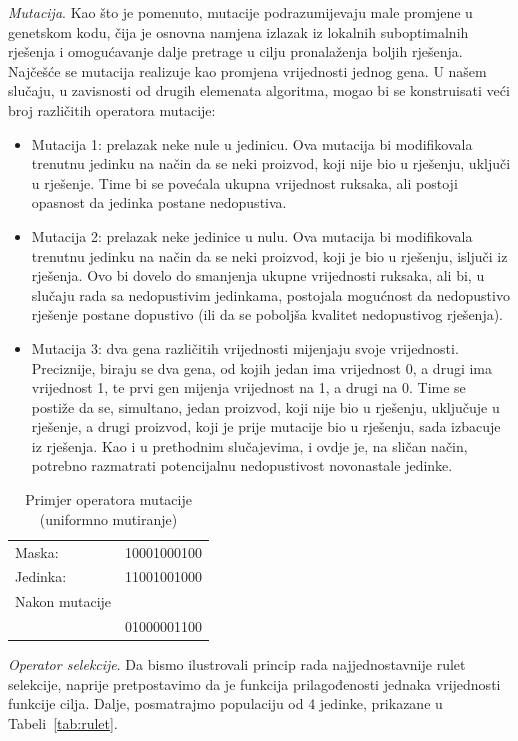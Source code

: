 \documentclass[a4paper, utf8, 11pt, colorlinks]{book}
\begin{document}
\emph{Mutacija}. Kao što je pomenuto, mutacije podrazumijevaju male promjene u genetskom kodu, čija je osnovna namjena izlazak iz lokalnih suboptimalnih rješenja i omogućavanje dalje pretrage u cilju pronalaženja boljih rješenja. Najčešće se mutacija realizuje kao promjena vrijednosti jednog gena. U našem slučaju, u zavisnosti od drugih elemenata algoritma, mogao bi se konstruisati veći broj različitih operatora mutacije: 
\begin{itemize}
	\item Mutacija 1: prelazak neke nule u jedinicu. Ova mutacija bi modifikovala trenutnu jedinku na način da se neki proizvod, koji nije bio u rješenju, uključi u rješenje. Time bi se povećala ukupna vrijednost ruksaka, ali postoji opasnost da jedinka postane nedopustiva.
	\item  Mutacija 2: prelazak neke jedinice u nulu. Ova mutacija bi modifikovala trenutnu jedinku na način da se neki proizvod, koji je bio u rješenju, isljuči iz rješenja. Ovo bi dovelo do smanjenja ukupne vrijednosti ruksaka, ali bi, u slučaju rada sa nedopustivim jedinkama, postojala mogućnost da nedopustivo rješenje postane dopustivo (ili da se poboljša kvalitet nedopustivog rješenja).
	\item  Mutacija 3: dva gena različitih vrijednosti mijenjaju svoje vrijednosti. Preciznije, biraju se dva gena, od kojih jedan ima vrijednost 0, a drugi ima vrijednost 1, te prvi gen mijenja vrijednost na 1, a drugi na 0. Time se postiže da se, simultano, jedan proizvod, koji nije bio u rješenju, uključuje u rješenje, a drugi proizvod, koji je prije mutacije bio u rješenju, sada izbacuje iz rješenja. Kao i u prethodnim slučajevima, i ovdje je, na sličan način, potrebno razmatrati potencijalnu nedopustivost novonastale jedinke.
\end{itemize}

\begin{table}[H]
	\centering
	\begin{tabular}{lc}
		Maska:  & 10001000100  \\
		Jedinka: & 11001001000  \\
		Nakon mutacije &       \\
		               & 01000001100      \\
	\end{tabular}	
	\caption{Primjer operatora mutacije (uniformno mutiranje)}
\end{table}

\emph{Operator selekcije}. Da bismo ilustrovali princip rada najjednostavnije rulet selekcije, naprije pretpostavimo da je funkcija prilagođenosti jednaka vrijednosti funkcije cilja. Dalje, posmatrajmo populaciju od 4 jedinke, prikazane u Tabeli~\ref{tab:rulet}.
\end{document}
